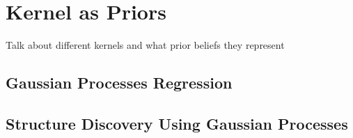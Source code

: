 \section{Kernel as Priors}
Talk about different kernels and what prior beliefs they represent

\subsection{Gaussian Processes Regression}

\subsection{Structure Discovery Using Gaussian Processes}
